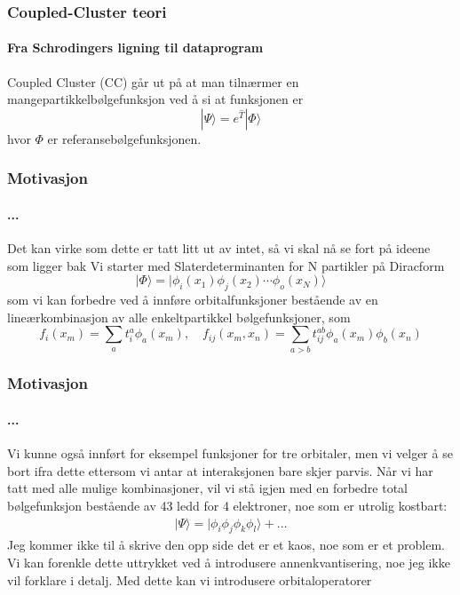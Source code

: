 \documentclass[norsk,a4paper,12pt]{beamer}
\begin{document}
  \begin{frame}
    \frametitle{Coupled-Cluster teori}
    \framesubtitle{Fra Schrodingers ligning til dataprogram}
    Coupled Cluster (CC) går ut på at man tilnærmer en mangepartikkelbølgefunksjon ved å si at funksjonen er
    \begin{equation}
    |\Psi\rangle=e^{\hat{T}}|\Phi\rangle
    \end{equation}
  hvor $\Phi$ er referansebølgefunksjonen. 
    
  \end{frame}
  \begin{frame}
    \frametitle{Motivasjon}
    \framesubtitle{...}
    Det kan virke som dette er tatt litt ut av intet, så vi skal nå se fort på ideene som ligger bak
    Vi starter med Slaterdeterminanten for N partikler på Diracform
    \begin{equation}
    |\Phi\rangle=|\phi_i(x_1)\phi_j(x_2)\cdots\phi_o(x_N)\rangle
    \end{equation}
    som vi kan forbedre ved å innføre orbitalfunksjoner bestående av en lineærkombinasjon av alle enkeltpartikkel bølgefunksjoner, som
    \begin{equation}
    f_i(x_m)=\sum_a t_i^a\phi_a(x_m),\quad f_{ij}(x_m,x_n)=\sum_{a>b}t_{ij}^{ab}\phi_a(x_m)\phi_b(x_n)
    \end{equation}
  \end{frame}
  \begin{frame}
    \frametitle{Motivasjon}
    \framesubtitle{...}
    Vi kunne også innført for eksempel funksjoner for tre orbitaler, men vi velger å se bort ifra dette ettersom vi antar at interaksjonen bare skjer parvis. Når vi har tatt med alle mulige kombinasjoner, vil vi stå igjen med en forbedre total bølgefunksjon bestående av 43 ledd for 4 elektroner, noe som er utrolig kostbart:
    \begin{align}
    |\Psi\rangle=|\phi_i\phi_j\phi_k\phi_l\rangle+\hdots
    \end{align}
    Jeg kommer ikke til å skrive den opp side det er et kaos, noe som er et problem. Vi kan forenkle dette uttrykket ved å introdusere annenkvantisering, noe jeg ikke vil forklare i detalj. Med dette kan vi introdusere orbitaloperatorer 
  \end{frame}
\end{document}
